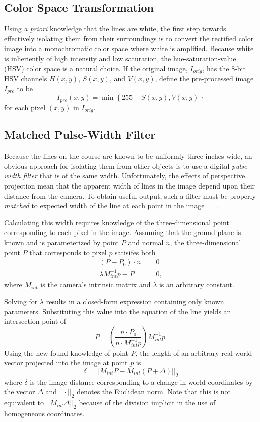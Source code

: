 \documentclass[11pt,twocolumn]{article}
\begin{document}
\subsection{Color Space Transformation}
Using \textit{a priori} knowledge that the lines are white, the first step
towards effectively isolating them from their surroundings is to convert the
rectified color image into a monochromatic color space where white is
amplified. Because white is inheriently of high intensity and low saturation,
the hue-saturation-value (HSV) color space is a natural choice. If the original
image, $I_{orig}$, has the 8-bit HSV channels $H(x,y)$, $S(x, y)$, and $V(x,
y)$, define the pre-processed image $I_{pre}$ to be
\begin{equation*}
	I_{pre}(x, y) = \min\left\{255 - S(x, y), V(x, y)\right\}
\end{equation*}
for each pixel $(x, y)$ in $I_{orig}$.

\subsection{Matched Pulse-Width Filter}
Because the lines on the course are known to be uniformly three inches wide, an
obvious approach for isolating them from other objects is to use a digital
\textit{pulse-width filter} that is of the same width. Unfortunately, the
effects of perspective projection mean that the apparent width of lines in the
image depend upon their distance from the camera. To obtain useful output, such
a filter must be properly \textit{matched} to expected width of the line at
each point in the image ~\cite{huang_thesis} ~\cite{huang_paper}.

Calculating this width requires knowledge of the three-dimensional point
corresponding to each pixel in the image. Assuming that the ground plane is
known and is parameterized by point $P$ and normal $n$, the three-dimensional
point $P$ that corresponds to pixel $p$ satisifes both
\begin{align*}
	(P - P_0) \cdot n          &= 0 \\
	\lambda M^{-1}_{int} p - P &= 0,
\end{align*}
where $M_{int}$ is the camera's intrinsic matrix and $\lambda$ is an arbitrary
constant.

Solving for $\lambda$ results in a closed-form expression containing
only known parameters. Substituting this value into the equation of the
line yields an intersection point of
\begin{equation*}
 	P = \left(\frac{n \cdot P_0}{n \cdot M^{-1}_{int} p}\right) M^{-1}_{int} p.
	\label{eqn:line-point}
\end{equation*}
Using the new-found knowledge of point $P$, the length of an arbitrary real-world
vector projected into the image at point $p$ is
\begin{equation}
	\delta = ||M_{int} P - M_{int} (P + \Delta)||_2
	\label{eqn:line-width}
\end{equation}
where $\delta$ is the image distance corresponding to a change in world
coordinates by the vector $\Delta$ and $||\cdot||_2$ denotes the Euclidean
norm. Note that this is not equivalent to $||M_{int}\Delta||_2$ because of the
division implicit in the use of homogeneous coordinates.
\end{document}
